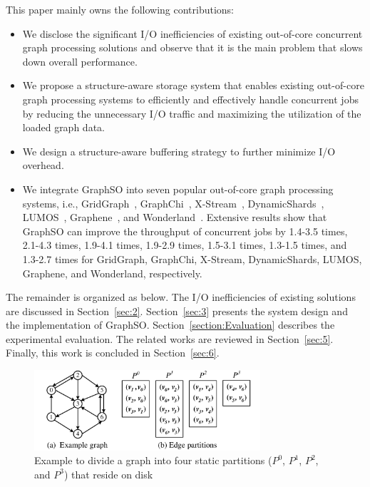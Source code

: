 \documentclass[10pt,journal,compsoc]{IEEEtran}
\begin{document}
This paper mainly owns the following contributions:
\vspace{-4pt}
\begin{itemize}
\vspace{-1pt}
\item We disclose the significant I/O inefficiencies of existing out-of-core concurrent graph processing solutions and observe that it is the main problem that slows down overall performance.
\vspace{-1pt}
\item We propose a structure-aware storage system that enables existing out-of-core graph processing systems to efficiently and effectively handle concurrent jobs by reducing the unnecessary I/O traffic and maximizing the utilization of the loaded graph data.
\item We design a structure-aware buffering strategy to further minimize I/O overhead.
\vspace{-1pt}
\item We integrate GraphSO into seven popular out-of-core graph processing systems, i.e., GridGraph~\cite{GridGraph},  GraphChi~\cite{GraphChi}, X-Stream~\cite{X-stream}, DynamicShards~\cite{Vora}, LUMOS~\cite{LUMOS}, Graphene~\cite{Graphene}, and Wonderland~\cite{Wonderland}. Extensive results show that GraphSO can improve the throughput of concurrent jobs by 1.4-3.5 times, 2.1-4.3 times, 1.9-4.1 times,  1.9-2.9 times, 1.5-3.1 times, 1.3-1.5 times, and 1.3-2.7 times for GridGraph, GraphChi, X-Stream, DynamicShards, LUMOS, Graphene, and Wonderland, respectively.
\vspace{-4pt}
\end{itemize}

The remainder is organized as below. The I/O inefficiencies of existing solutions are discussed in Section~\ref{sec:2}. Section~\ref{sec:3} presents the system design and the implementation of GraphSO. Section~\ref{section:Evaluation} describes the experimental evaluation. The related works are reviewed in Section~\ref{sec:5}. Finally, this work is concluded in Section~\ref{sec:6}.


\begin{figure}[!t]
	\centering
	\includegraphics[width=3.3in]{graph.pdf}
	\vspace{-15pt}
	\caption{Example to divide a graph into four static partitions ($P^0$, $P^1$, $P^2$, and $P^3$) that reside on disk}
	\label{graph}
	\vspace{-17pt}
\end{figure}
\end{document}
